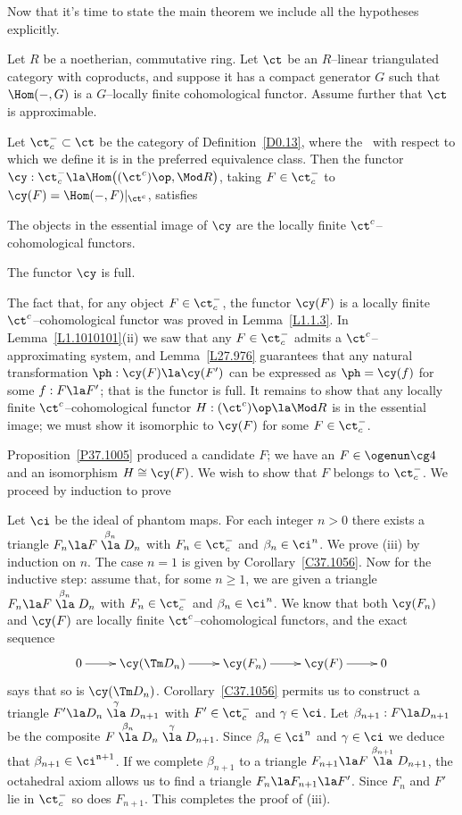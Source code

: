 \documentclass[11pt]{amsart}
\newcommand{\n}{\mathfrak{n}}
\begin{document}
Now that it's time to state the main theorem we include all the hypotheses
explicitly.

Let $R$ be a noetherian, commutative ring.
Let $\ct$ be an $R$--linear triangulated category with coproducts,
and suppose it has
a compact generator $G$ 
such that $\Hom(-,G)$ is a $G$--locally finite cohomological functor.
Assume further that $\ct$ is approximable.

Let $\ct^-_c\subset\ct$ be the category of Definition~\ref{D0.13}, where
the \tstr\ with respect to which we define it is in the preferred
equivalence class. Then the functor 
$\cy:\ct^-_c\la \Hom\big((\ct^c)\op,\Mod R\big)$, taking
$F\in\ct^-_c$ to $\cy(F)=\Hom(-,F)|_{\ct^c}$, satisfies
\be
\item
  The objects in the essential image of $\cy$
  are the locally finite $\ct^c$--cohomological functors.
\item
  The functor $\cy$ is full.
\setcounter{enumiv}{\value{enumi}}
\ee
\ethm

\prf
The fact that, for any object $F\in\ct^-_c$, the functor
$\cy(F)$
is a locally finite $\ct^c$--cohomological functor was proved
in Lemma~\ref{L1.1.3}. In Lemma~\ref{L1.1010101}(ii) we saw that any
$F\in\ct^-_c$ admits a $\ct^c$--approximating system, and Lemma~\ref{L27.976}
guarantees that any natural transformation
$\ph:\cy(F)\la \cy(F')$ can be expressed as
$\ph=\cy(f)$ for some $f:F\la F'$; that is the functor is
full. It remains to show that any
locally finite $\ct^c$--cohomological functor $H:(\ct^c)\op\la\Mod R$
is in the essential image; we must show it isomorphic to
$\cy(F)$ for some $F\in\ct^-_c$.

Proposition~\ref{P37.1005} produced a candidate $F$; we have
an $F\in\ogenun\cg4$ and an isomorphism $H\cong \cy(F)$.
We wish to show that $F$ belongs to $\ct^-_c$. We proceed by induction
to prove
\be
\setcounter{enumi}{\value{enumiv}}
\item
  Let $\ci$ be the ideal of phantom maps. For
  each integer $n>0$ there exists a triangle
  $F_n\la F\stackrel{\beta_n}\la D_n$ with $F_n\in\ct^-_c$ and
  $\beta_n\in\ci^n$.
\setcounter{enumiv}{\value{enumi}}
\ee
We prove (iii) by induction on $n$. The case $n=1$ is given by
Corollary~\ref{C37.1056}. Now for the inductive step:
assume that, for some $n\geq1$, we are given
a triangle $F_n\la F\stackrel{\beta_n}\la D_n$ with $F_n\in\ct^-_c$ and
$\beta_n\in\ci^n$.
We know that both $\cy(F_n)$
and $\cy(F)$ are locally finite $\ct^c$--cohomological
functors, and the exact sequence
\[\xymatrix{
  0\ar[r] & \cy(\Tm D_n) \ar[r] & \cy(F_n)\ar[r] &
  \cy(F)\ar[r] & 0
}\]
says that so is $\cy(\Tm D_n)$. Corollary~\ref{C37.1056}
permits us to construct a triangle $F'\la D_n\stackrel\gamma\la D_{n+1}$
with $F'\in\ct^-_c$ and $\gamma\in\ci$. Let
$\beta_{n+1}:F\la D_{n+1}$ be the
composite $F\stackrel{\beta_n}\la D_{n} \stackrel\gamma\la D_{n+1}$.
Since $\beta_n\in\ci^n$ and $\gamma\in\ci$ we deduce
that $\beta_{n+1}\in\ci^{\n+1}$.
If we complete $\beta_{n+1}$ to a
triangle $F_{n+1}\la F\stackrel{\beta_{n+1}}\la D_{n+1}$,
the octahedral axiom allows us to find a triangle $F_n\la F_{n+1}\la F'$.
Since $F_n$ and $F'$ lie in $\ct^-_c$ so does $F_{n+1}$. This
completes the proof of (iii).
\end{document}
